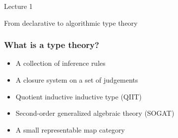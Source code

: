\documentclass[10pt]{beamer}
\begin{document}
\begin{frame}
  \begin{center}
    \Huge Lecture 1

    \bigskip

    \Large
    From declarative to algorithmic type theory
  \end{center}
\end{frame}


\begin{frame}
  \frametitle{What is a type theory?}

  \begin{itemize}
  \item A collection of inference rules
  \item A closure system on a set of judgements
  \item Quotient inductive inductive type (QIIT)
  \item Second-order generalized algebraic theory (SOGAT)
  \item A small representable map category
  \end{itemize}


\end{frame}

\end{document}
